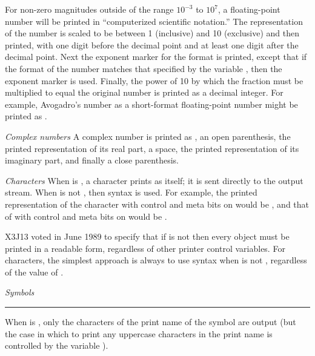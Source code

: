 \begin{flushdesc}
For non-zero magnitudes
outside of the range $10^{-3}$
to $10^7$, a floating-point number
will be printed in ``computerized scientific
notation.''  The representation of the number is scaled to be between
1 (inclusive) and 10 (exclusive) and then printed, with one digit
before the decimal point and at least one digit after the decimal point.
Next the exponent marker for the format is printed,
except that
if the format of the number matches that specified by the variable
, then the exponent marker 
is used.
Finally, the power of 10 by which the fraction must be multiplied
to equal the original number is printed as a decimal integer.
For example, Avogadro's number as a short-format floating-point number
might be printed as .

\item[\emph{Complex numbers}]
A complex number is printed as ,
an open parenthesis,
the printed representation of its real part, a space,
the printed representation of its imaginary part, and finally
a close parenthesis.


\begin{obsolete}
\item[\emph{Characters}]
When  is {\false}, a character prints as itself;
it is sent directly to the output stream.
When  is not {\false}, then \cd{\#{\Xbackslash}} syntax is used.
For example, the
printed representation of the character  with control and meta
bits on would be , and that of  with
control and meta bits on would be .
\end{obsolete}
\begin{newer}
X3J13 voted in June 1989  to specify that if 
is not {\false} then every object must be printed in a readable form,
regardless of other printer control variables.  For characters, the simplest approach
is always to use \cd{\#{\Xbackslash}} syntax when 
is not {\false}, regardless of the value of .
\end{newer}


\begin{obsolete}
\item[\emph{Symbols}]

\hrule width 0pt\relax

When  is {\false}, only the characters of the print name
of the symbol are output (but the case in which to print any
uppercase characters in the print name is controlled by the
variable ).
\end{obsolete}


\end{flushdesc}

